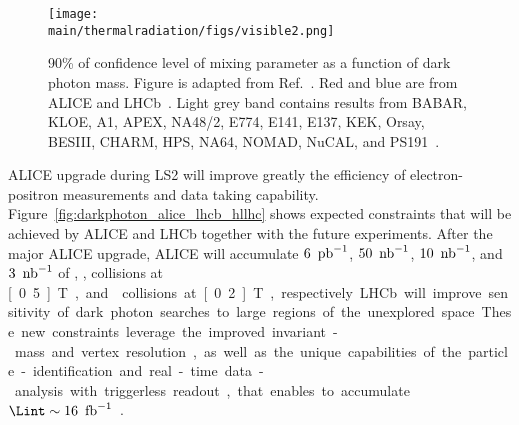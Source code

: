 \documentclass[../report.tex]{subfiles}
\providecommand{\main}{..}
\begin{document}
\begin{figure}[htbp]
\begin{center}
\texttt{[image: \\main/thermalradiation/figs/visible2.png]}
\end{center}
\caption{90\% of confidence level of mixing parameter as a function of dark photon mass. Figure is adapted from Ref.~\cite{Ilten:2018crw}. 
Red and blue are from ALICE and LHCb~\cite{Aaij:2017rft}. 
Light grey band contains results from BABAR, KLOE, A1, APEX, NA48/2,  E774, E141, E137, KEK, Orsay, BESIII, CHARM, HPS, NA64, NOMAD, NuCAL, and PS191~\cite{Ilten:2018crw}.}
\label{fig:darkphoton_alice_lhcb}
\end{figure}
 

ALICE upgrade during LS2 will improve greatly 
the efficiency of electron-positron measurements and data taking capability.
Figure~\ref{fig:darkphoton_alice_lhcb_hllhc} shows 
expected constraints that will be achieved by ALICE and LHCb
together with the future experiments. 
After the major ALICE upgrade, ALICE will accumulate 
$\unit[6]{\Upb^{-1}}$, $\unit[50]{\Unb^{-1}}$, $\unit[10]{\Unb^{-1}}$, and $\unit[3]{\Unb^{-1}}$
of \pp, \pPb, \PbPb{} collisions at \unit[0.5]{T}, and \PbPb{} collisions at \unit[0.2]{T}, 
respectively. 
LHCb will improve sensitivity of dark photon searches to large regions 
of the unexplored space. These new constraints leverage the improved invariant-mass and vertex resolution, 
as well as the unique capabilities of the particle-identification and real-time 
data-analysis with triggerless readout, 
that enables to accumulate $\Lint \sim \unit[16]{\Ufb^{-1}}$~\cite{Ilten:2016tkc}.
\end{document}
